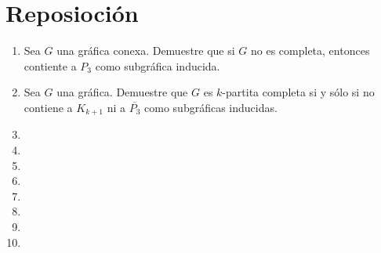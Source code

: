 \documentclass{article}
\begin{document}
\section*{\LARGE{Reposioción}}
\begin{enumerate}
\item Sea $G$ una gr\'afica conexa. Demuestre que si $G$ no es
  completa, entonces contiente a $P_3$ como subgr\'afica inducida.
  
\item Sea $G$ una gr\'afica. Demuestre que $G$ es $k$-partita completa si y
      s\'olo si no contiene a $K_{k+1}$ ni a $\overline{P_3}$ como subgr\'aficas
      inducidas.
  
\item
\item
\item
\item
\item
\item
\item
\item
\end{enumerate}
\end{document}
